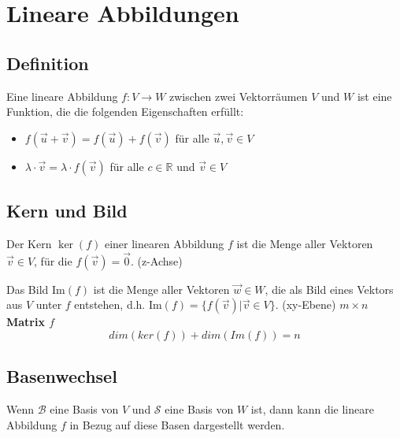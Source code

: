 \documentclass{article}
\begin{document}
\pagebreak

\section*{Lineare Abbildungen}
\begin{minipage}[t]{0.45\textwidth}
    \subsection*{Definition}
    Eine lineare Abbildung \( f: V \to W \) zwischen zwei Vektorräumen \( V \) und \( W \) ist eine Funktion, die die folgenden Eigenschaften erfüllt:
    \begin{itemize}
        \item \( f(\vec{u} + \vec{v}) = f(\vec{u}) + f(\vec{v}) \) für alle \( \vec{u}, \vec{v} \in V \)
        \item $\lambda \cdot \vec{v} = \lambda \cdot f(\vec{v})$ für alle \( c \in \mathbb{R} \) und \( \vec{v} \in V \)
    \end{itemize}

    \subsection*{Kern und Bild}
    Der Kern \( \ker(f) \) einer linearen Abbildung \( f \) ist die Menge aller Vektoren \( \vec{v} \in V \), für die \( f(\vec{v}) = \vec{0} \). (z-Achse)
    
    Das Bild \( \text{Im}(f) \) ist die Menge aller Vektoren \( \vec{w} \in W \), die als Bild eines Vektors aus \( V \) unter \( f \) entstehen, d.h. \( \text{Im}(f) = \{ f(\vec{v}) | \vec{v} \in V \} \). (xy-Ebene)
    \newline
    \newline
    \textbf{$m \times n$ Matrix $f$ }
    \begin{equation*}
        dim(ker(f)) + dim(Im(f)) = n
    \end{equation*}

    \subsection*{Basenwechsel}
    Wenn \( \mathcal{B} \) eine Basis von \( V \) und \( \mathcal{S} \) eine Basis von \( W \) ist, dann kann die lineare Abbildung \( f \) in Bezug auf diese Basen dargestellt werden.


\end{minipage}
\end{document}
